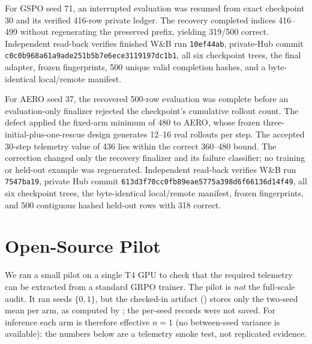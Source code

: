 \documentclass[11pt]{article}
\begin{document}
For GSPO seed 71, an interrupted evaluation was resumed from exact checkpoint
30 and its verified 416-row private ledger. The recovery completed indices
416--499 without regenerating the preserved prefix, yielding 319/500 correct.
Independent read-back verifies finished W\&B run \texttt{10ef44ab}, private-Hub
commit \texttt{c0c0b968a61a9ade251b5b7e6ece3119197dc1b1}, all six checkpoint
trees, the final adapter, frozen fingerprints, 500 unique valid completion
hashes, and a byte-identical local/remote manifest.

For AERO seed 37, the recovered 500-row evaluation was complete before an
evaluation-only finalizer rejected the checkpoint's cumulative rollout count.
The defect applied the fixed-arm minimum of 480 to AERO, whose frozen
three-initial-plus-one-rescue design generates 12--16 real rollouts per step.
The accepted 30-step telemetry value of 436 lies within the correct 360--480
bound. The correction changed only the recovery finalizer and its failure
classifier; no training or held-out example was regenerated. Independent
read-back verifies W\&B run \texttt{7547ba19}, private Hub commit
\texttt{613d3f70cc0fb89eae5775a398d6f66136d14f49}, all six checkpoint trees,
the byte-identical local/remote manifest, frozen fingerprints, and 500
contiguous hashed held-out rows with 318 correct.

\section{Open-Source Pilot}
\label{sec:pilot}

We ran a small pilot on a single T4 GPU to check that the required telemetry
can be extracted from a standard GRPO trainer. The pilot is \emph{not} the
full-scale audit. It ran seeds $\{0,1\}$, but the checked-in artifact
() stores only
the two-seed mean per arm, as computed by
; the per-seed records
were not saved. For inference each arm is therefore effective $n=1$ (no
between-seed variance is available): the numbers below are a telemetry smoke
test, not replicated evidence.
\end{document}
